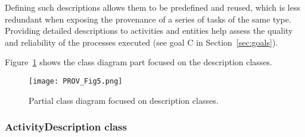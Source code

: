 Defining such descriptions allows them to be predefined and reused, which is less redundant when exposing the provenance of a series of tasks of the same type. 
Providing detailed descriptions to activities and entities help assess the quality and reliability of the processes executed (see goal C in Section~\ref{sec:goals}).

Figure~\ref{fig:classdiagram_descriptions} shows the class diagram part focused on the description classes. 

\begin{figure}[ht]
\centering
\texttt{[image: PROV\_Fig5.png]}
\caption[Partial class diagram focused on description classes.]{Partial class diagram focused on description classes.}
\label{fig:classdiagram_descriptions}
\end{figure}








\subsubsection{ActivityDescription class}
\label{sec:activity_desc}


